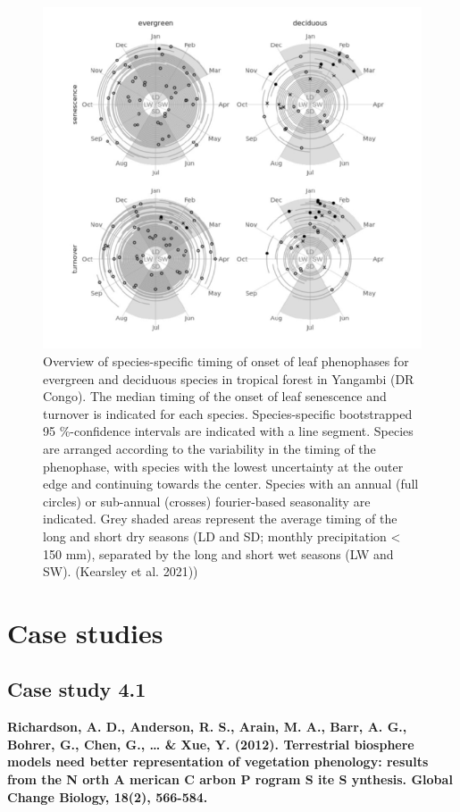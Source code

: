 \documentclass[12pt,oneside]{book}
\begin{document}
\begin{figure}

{\centering \includegraphics[width=0.8\linewidth]{figures/chap4/f410_kearsley} 

}

\caption{Overview of species-specific timing of onset of leaf phenophases for evergreen and deciduous species in tropical forest in Yangambi (DR Congo). The median timing of the onset of leaf senescence and turnover is indicated for each species. Species-specific bootstrapped 95 \%-confidence intervals are indicated with a line segment. Species are arranged according to the variability in the timing of the phenophase, with species with the lowest uncertainty at the outer edge and continuing towards the center. Species with an annual (full circles) or sub-annual (crosses) fourier-based seasonality are indicated. Grey shaded areas represent the average timing of the long and short dry seasons (LD and SD; monthly precipitation < 150 mm), separated by the long and short wet seasons (LW and SW). (Kearsley et al. 2021))}\label{fig:f48}
\end{figure}

\section{Case studies}\label{case-studies-2}

\subsection{Case study 4.1}\label{case-study-4.1}

\textbf{Richardson, A. D., Anderson, R. S., Arain, M. A., Barr, A. G.,
Bohrer, G., Chen, G., \ldots{} \& Xue, Y. (2012). Terrestrial biosphere
models need better representation of vegetation phenology: results from
the N orth A merican C arbon P rogram S ite S ynthesis. Global Change
Biology, 18(2), 566-584.}
\end{document}
